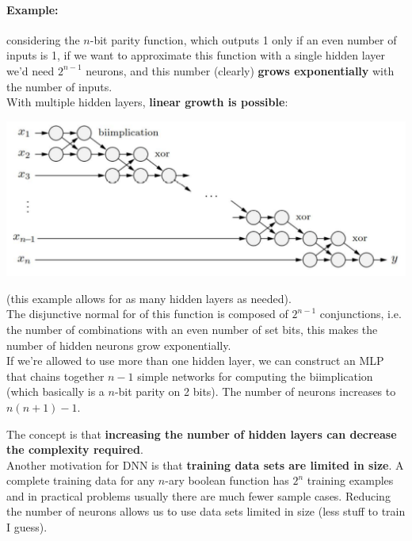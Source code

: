 \documentclass[11pt]{article}
\begin{document}
		\paragraph{Example:} considering the $n$-bit parity function, which outputs 1 only if an even number of inputs is 1, if we want to approximate this function with a single hidden layer we'd need $2^{n-1}$ neurons, and this number (clearly) \textbf{grows exponentially} with the number of inputs. \\
		
		With multiple hidden layers, \textbf{linear growth is possible}:
		\begin{center}
			\includegraphics[width=0.95\columnwidth]{img/NN/nbitparity1}
		\end{center}
		(this example allows for as many hidden layers as needed).\\
		The disjunctive normal for of this function is composed of $2^{n-1}$ conjunctions, i.e. the number of combinations with an even number of set bits, this makes the number of hidden neurons grow exponentially.\\
		If we're allowed to use more than one hidden layer, we can construct an MLP that chains together $n-1$ simple networks for computing the biimplication (which basically is a $n$-bit parity on 2 bits). The number of neurons increases to $n(n+1)-1$.
		
		\newpage
		
		The concept is that \textbf{increasing the number of hidden layers can decrease the complexity required}.\\
		
		Another motivation for DNN is that \textbf{training data sets are limited in size}. A complete training data for any $n$-ary boolean function has $2^n$ training examples and in practical problems usually there are much fewer sample cases. Reducing the number of neurons allows us to use data sets limited in size (less stuff to train I guess).\\
		
\end{document}

